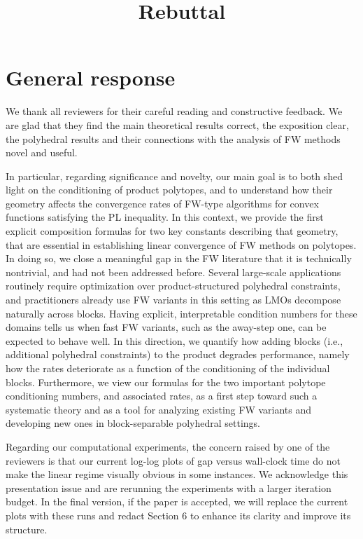 \documentclass[a4wide]{article}
\title{Rebuttal}
\author{{}}
\begin{document}
\maketitle

\section*{General response}

We thank all reviewers for their careful reading and constructive feedback. We are glad that they find the main theoretical results correct, the exposition clear, the polyhedral results and their connections with the analysis of FW methods novel and useful.

In particular, regarding significance and novelty, our main goal is to both shed light on the conditioning of product polytopes, and to understand how their geometry affects the convergence rates of FW-type algorithms for convex functions satisfying the PL inequality.
In this context, we provide the first explicit composition formulas for two key constants describing that geometry, that are essential in establishing linear convergence of FW methods on polytopes. In doing so, we close a meaningful gap in the FW literature that it is technically nontrivial, and had not been addressed before. 
Several large-scale applications routinely require optimization over product-structured polyhedral constraints, and practitioners already use FW variants in this setting as LMOs decompose naturally across blocks. Having explicit, interpretable condition numbers for these domains tells us when fast FW variants, such as the away-step one, can be expected to behave well. In this direction, we quantify how adding blocks (i.e., additional polyhedral constraints) to the product degrades performance, namely how the rates deteriorate as a function of the conditioning of the individual blocks.
Furthermore, we view our formulas for the two important polytope conditioning numbers, and associated rates, as a first step toward such a systematic theory and as a tool for analyzing existing FW variants and developing new ones in block-separable polyhedral settings.

Regarding our computational experiments, the concern raised by one of the reviewers is that our current log-log plots of gap versus wall-clock time do not make the linear regime visually obvious in some instances. We acknowledge this presentation issue and are rerunning the experiments with a larger iteration budget. 
In the final version, if the paper is accepted, we will replace the current plots with these runs and redact Section 6 to enhance its clarity and improve its structure.
\end{document}
